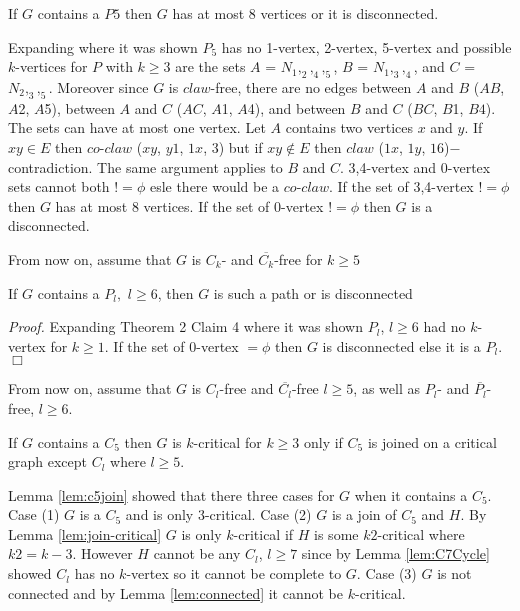 \begin{Lemma}\label{lem:P58V}
If $G$ contains a $P5$ then $G$ has at most 8 vertices or it is disconnected.
\end{Lemma}
 Expanding \cite{BraFud2002} where it was shown $P_5$ has no 1-vertex, 2-vertex, 5-vertex and possible $k$-vertices for $P$ with $k \geq 3$ are the sets $A$ = $N_1,_2,_4,_5$, $B$ = $N_1,_3,_4$, and $C$ = $N_2,_3,_5$. Moreover since $G$ is $claw$-free, there are no edges between $A$ and $B$ ($AB$, $A$2, $A$5), between $A$ and $C$ ($AC$, $A$1, $A$4), and between $B$ and $C$ ($BC$, $B$1, $B4$). The sets can have at most one vertex. Let $A$ contains two vertices $x$ and $y$. If $xy \in E$ then $co$-$claw$ ($xy$, $y1$, $1x$, $3$) but if $xy \not\in E$ then $claw$ ($1x$, $1y$, $16$)$-$contradiction. The same argument applies to $B$ and $C$. 3,4-vertex and 0-vertex sets cannot both $!= \phi$ esle there would be a $co$-$claw$. If the set of 3,4-vertex $!= \phi$ then $G$ has at most 8 vertices. If the set of 0-vertex $!= \phi$ then $G$ is a disconnected.

From now on, assume that $G$ is $C_k$- and $\overline{C_k}$-free for $k \geq 5$

\begin{Lemma}\label{lem:P6Path}
If $G$ contains a $P_l,$ $l \geq 6$, then $G$ is such a path or is disconnected
\end{Lemma}
{\it Proof.} Expanding \cite{BraFud2002} Theorem 2 Claim 4 where it was shown $P_l$, $l \geq 6$ had no $k$-vertex for $k \geq 1$. If the set of 0-vertex $= \phi$ then $G$ is disconnected else it is a $P_l$.  $\Box$

From now on, assume that $G$ is $C_l$-free and $\overline{C_l}$-free $l \geq 5$, as well as $P_l$- and $\overline{P_l}$-free, $l \geq 6$.


\begin{Lemma}\label{lem:c5critical}
If $G$ contains a $C_5$ then $G$ is $k$-critical for $k \geq 3$ only if $C_5$ is joined on a critical graph except $C_l$ where $l \geq 5$.
\end{Lemma}
 Lemma \ref{lem:c5join} showed that there three cases for $G$ when it contains a $C_5$. Case (1) $G$ is a $C_5$ and is only 3-critical. Case (2) $G$ is a join of $C_5$ and $H$. By Lemma \ref{lem:join-critical} $G$ is only $k$-critical if $H$ is some $k2$-critical where $k2 = k - 3$. However $H$ cannot be any $C_l$, $l \geq 7$ since by Lemma \ref{lem:C7Cycle} showed $C_l$ has no $k$-vertex so it cannot be complete to $G$. Case (3) $G$ is not connected and by Lemma \ref{lem:connected} it cannot be $k$-critical.


